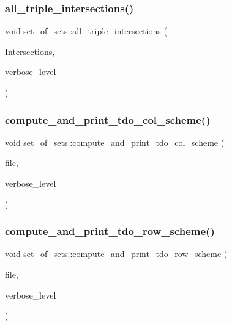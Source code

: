 \subsubsection{\texorpdfstring{all\+\_\+triple\+\_\+intersections()}{all\_triple\_intersections()}}
{\footnotesize\ttfamily void set\+\_\+of\+\_\+sets\+::all\+\_\+triple\+\_\+intersections (\begin{DoxyParamCaption}\item[{\mbox{\hyperlink{classset__of__sets}{set\+\_\+of\+\_\+sets}} $\ast$\&}]{Intersections,  }\item[{\mbox{\hyperlink{galois_8h_a09fddde158a3a20bd2dcadb609de11dc}{I\+NT}}}]{verbose\+\_\+level }\end{DoxyParamCaption})}

\mbox{\label{classset__of__sets_a1b9fcc06eca06e73bf58c733263c9dcb}} 
\subsubsection{\texorpdfstring{compute\+\_\+and\+\_\+print\+\_\+tdo\+\_\+col\+\_\+scheme()}{compute\_and\_print\_tdo\_col\_scheme()}}
{\footnotesize\ttfamily void set\+\_\+of\+\_\+sets\+::compute\+\_\+and\+\_\+print\+\_\+tdo\+\_\+col\+\_\+scheme (\begin{DoxyParamCaption}\item[{ofstream \&}]{file,  }\item[{\mbox{\hyperlink{galois_8h_a09fddde158a3a20bd2dcadb609de11dc}{I\+NT}}}]{verbose\+\_\+level }\end{DoxyParamCaption})}

\mbox{\label{classset__of__sets_a4f4a0a209697442ef414d2687c9faadc}} 
\subsubsection{\texorpdfstring{compute\+\_\+and\+\_\+print\+\_\+tdo\+\_\+row\+\_\+scheme()}{compute\_and\_print\_tdo\_row\_scheme()}}
{\footnotesize\ttfamily void set\+\_\+of\+\_\+sets\+::compute\+\_\+and\+\_\+print\+\_\+tdo\+\_\+row\+\_\+scheme (\begin{DoxyParamCaption}\item[{ofstream \&}]{file,  }\item[{\mbox{\hyperlink{galois_8h_a09fddde158a3a20bd2dcadb609de11dc}{I\+NT}}}]{verbose\+\_\+level }\end{DoxyParamCaption})}

